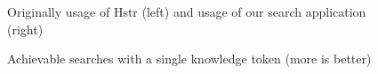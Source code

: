\begin{figure}
\centering
{}\hfill
{}
\caption{Achievable searches with a single knowledge token (more is better)}
\small{Originally usage of Hstr (left) and usage of our search application (right)}
\label{eval-metrics-plot-dist-1-cmds}
\end{figure}

